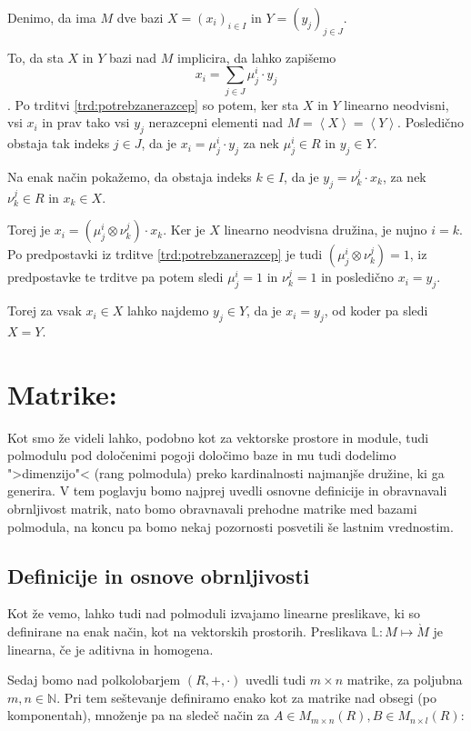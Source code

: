 \documentclass[mat1]{fmfdelo}
\newcommand{\N}{\mathbb{N}}
\newcommand{\Gen}[1]{\ensuremath{\left<{#1}\right>}}
\begin{document}
\begin{dokaz}
	Denimo, da ima $M$ dve bazi $X=(x_i)_{i\in I}$ in $Y=(y_j)_{j \in J}$. 
	
	To, da sta $X$ in $Y$ bazi nad $M$ implicira, da lahko zapišemo $$x_i = \sum_{j\in J}\mu_j^i\cdot y_j $$.
	Po trditvi \ref{trd:potrebzanerazcep} so potem, ker sta $X$ in $Y$ linearno neodvisni, vsi $x_i$ in prav tako vsi $y_j$ nerazcepni elementi nad $M = \Gen{X} = \Gen{Y}$. Posledično obstaja tak indeks $j\in J$, da je $x_i = \mu_j^i \cdot y_j$ za nek $\mu_j^i \in R$ in $y_j\in Y$.
	
	Na enak način pokažemo, da obstaja indeks $k\in I$, da je $y_j = \nu_k^j \cdot x_k$, za nek $\nu_k^j \in R$ in $x_k \in X$.

	Torej je $x_i = (\mu_j^i \otimes \nu_k^j) \cdot x_k$. Ker je $X$ linearno neodvisna družina, je nujno $i = k$. Po predpostavki iz trditve \ref{trd:potrebzanerazcep} je tudi $(\mu_j^i \otimes \nu_k^j) = 1$, iz predpostavke te trditve pa potem sledi $\mu_j^i = 1$ in $\nu_k^j = 1$ in posledično $x_i = y_j$.
	
	Torej za vsak $x_i\in X$ lahko najdemo $y_j\in Y$, da je $x_i = y_j$, od koder pa sledi $X = Y$.
\end{dokaz}

\section{Matrike:}
Kot smo že videli lahko, podobno kot za vektorske prostore in module, tudi polmodulu pod določenimi pogoji določimo baze in mu tudi dodelimo ">dimenzijo"< (rang polmodula) preko kardinalnosti najmanjše družine, ki ga generira. V tem poglavju bomo najprej uvedli osnovne definicije in obravnavali obrnljivost matrik, nato bomo obravnavali prehodne matrike med bazami polmodula, na koncu pa bomo nekaj pozornosti posvetili še lastnim vrednostim.

\subsection{Definicije in osnove obrnljivosti}\label{subsect:definv}

Kot že vemo, lahko tudi nad polmoduli izvajamo linearne preslikave, ki so definirane na enak način, kot na vektorskih prostorih. Preslikava $\mathbb{L}: M \mapsto \grave{M}$ je linearna, če je aditivna in homogena.

Sedaj bomo nad polkolobarjem $(R, +, \cdot)$ uvedli tudi $m\times n$ matrike, za poljubna $m,n\in\N$. Pri tem seštevanje definiramo enako kot za matrike nad obsegi (po komponentah), množenje pa na sledeč način za $A\in M_{m\times n}(R), B\in M_{n\times l}(R)$:
\end{document}
